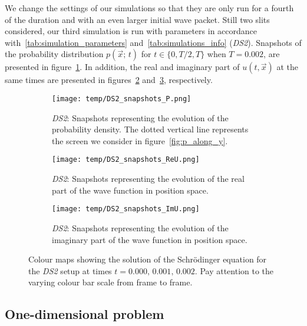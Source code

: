     We change the settings of our simulations so that they are only run for a fourth of the duration and with an even larger initial wave packet. Still two slits considered, our third simulation is run with parameters in accordance with~\ref{tab:simulation_parameters} and~\ref{tab:simulations_info} (\textit{DS2}). Snapshots of the probability distribution $p(\vec{x};\, t)$ for $t\in\{0,T/2,T\}$ when $T=0.002$, are presented in figure~\ref{fig:snapshots_p_DS2}. In addition, the real and imaginary part of $u(t, \vec{x})$ at the same times are presented in figures~\ref{fig:snapshots_ReU_DS2} and~\ref{fig:snapshots_ImU_DS2}, respectively.


    \begin{figure*}
        \centering
        \begin{subfigure}{0.92\textwidth}
            \texttt{[image: temp/DS2\_snapshots\_P.png]}
            \caption{\textit{DS2}: Snapshots representing the evolution of the probability density. The dotted vertical line represents the screen we consider in figure~\ref{fig:p_along_y}.}
            \label{fig:snapshots_p_DS2}
        \end{subfigure}
        \hfill
        \begin{subfigure}{0.92\textwidth}
            \texttt{[image: temp/DS2\_snapshots\_ReU.png]}
            \caption{\textit{DS2}: Snapshots representing the evolution of the real part of the wave function in position space.}
            \label{fig:snapshots_ReU_DS2}
        \end{subfigure}
        \hfill
        \begin{subfigure}{0.92\textwidth}
            \texttt{[image: temp/DS2\_snapshots\_ImU.png]}
            \caption{\textit{DS2}: Snapshots representing the evolution of the imaginary part of the wave function in position space.}
            \label{fig:snapshots_ImU_DS2}
        \end{subfigure}
        \caption{Colour maps showing the solution of the Schrödinger equation for the \textit{DS2} setup at times $t=0.000,\, 0.001, \,0.002$. Pay attention to the varying colour bar scale from frame to frame.}
        \label{fig:snapshots_DS2}
    \end{figure*}


\subsection{One-dimensional problem}

